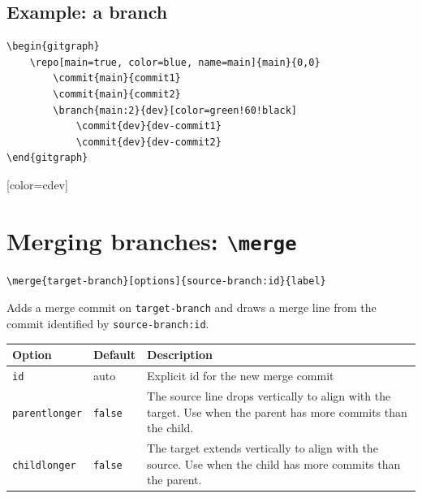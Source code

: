 \documentclass{article}
\newcommand{\cmd}[1]{\texttt{\textbackslash#1}}
\newcommand{\opt}[1]{\texttt{#1}}
\begin{document}
        \subsection{Example: a branch}

            \begin{verbatim}
\begin{gitgraph}
    \repo[main=true, color=blue, name=main]{main}{0,0}
        \commit{main}{commit1}
        \commit{main}{commit2}
        \branch{main:2}{dev}[color=green!60!black]
            \commit{dev}{dev-commit1}
            \commit{dev}{dev-commit2}
\end{gitgraph}
            \end{verbatim}

            \begin{center}
                \begin{gitgraph}
                        [color=cdev]
                \end{gitgraph}
            \end{center}

    \section{Merging branches: \cmd{merge}}

        \begin{verbatim}
\merge{target-branch}[options]{source-branch:id}{label}
        \end{verbatim}

        Adds a merge commit on \texttt{target-branch} and draws a merge line from the commit identified by \texttt{source-branch:id}.

        \bigskip
        \begin{tabularx}{\textwidth}{llX}
            \hline
            \textbf{Option} & \textbf{Default} & \textbf{Description} \\
            \hline
            \opt{id}           & auto         & Explicit id for the new merge commit \\
            \opt{parentlonger} & \opt{false}  & The source line drops vertically to align with the target.
                                                Use when the parent has more commits than the child. \\
            \opt{childlonger}  & \opt{false}  & The target extends vertically to align with the source.
                                                Use when the child has more commits than the parent. \\
            \hline
        \end{tabularx}
\end{document}
